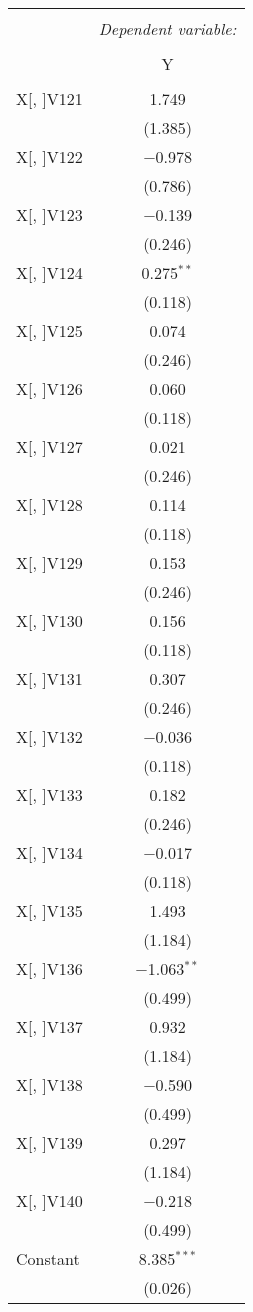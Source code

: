 \documentclass[11pt, a4paper]{article}
\begin{document}
\begin{multicols}{2}
\FloatBarrier
\begin{center}
\begin{tabular}{@{\extracolsep{5pt}}lc} 
\\[-1.8ex]\hline 
\hline \\[-1.8ex] 
 & \multicolumn{1}{c}{\textit{Dependent variable:}} \\ 
\cline{2-2} 
\\[-1.8ex] & Y \\ 
\hline \\[-1.8ex] 
 X[, ]V121 & 1.749 \\ 
  & (1.385) \\  
 X[, ]V122 & $-$0.978 \\ 
  & (0.786) \\  
 X[, ]V123 & $-$0.139 \\ 
  & (0.246) \\ 
 X[, ]V124 & 0.275$^{**}$ \\ 
  & (0.118) \\  
 X[, ]V125 & 0.074 \\ 
  & (0.246) \\  
 X[, ]V126 & 0.060 \\ 
  & (0.118) \\  
 X[, ]V127 & 0.021 \\ 
  & (0.246) \\  
 X[, ]V128 & 0.114 \\ 
  & (0.118) \\  
 X[, ]V129 & 0.153 \\ 
  & (0.246) \\  
 X[, ]V130 & 0.156 \\ 
  & (0.118) \\ 
 X[, ]V131 & 0.307 \\ 
  & (0.246) \\  
 X[, ]V132 & $-$0.036 \\ 
  & (0.118) \\  
 X[, ]V133 & 0.182 \\ 
  & (0.246) \\  
 X[, ]V134 & $-$0.017 \\ 
  & (0.118) \\ 
 X[, ]V135 & 1.493 \\ 
  & (1.184) \\  
 X[, ]V136 & $-$1.063$^{**}$ \\ 
  & (0.499) \\  
 X[, ]V137 & 0.932 \\ 
  & (1.184) \\ 
 X[, ]V138 & $-$0.590 \\ 
  & (0.499) \\  
 X[, ]V139 & 0.297 \\ 
  & (1.184) \\  
 X[, ]V140 & $-$0.218 \\ 
  & (0.499) \\ 
 Constant & 8.385$^{***}$ \\ 
  & (0.026) \\  
\end{tabular} 
\end{center}
\end{multicols}
\FloatBarrier
\end{document}
